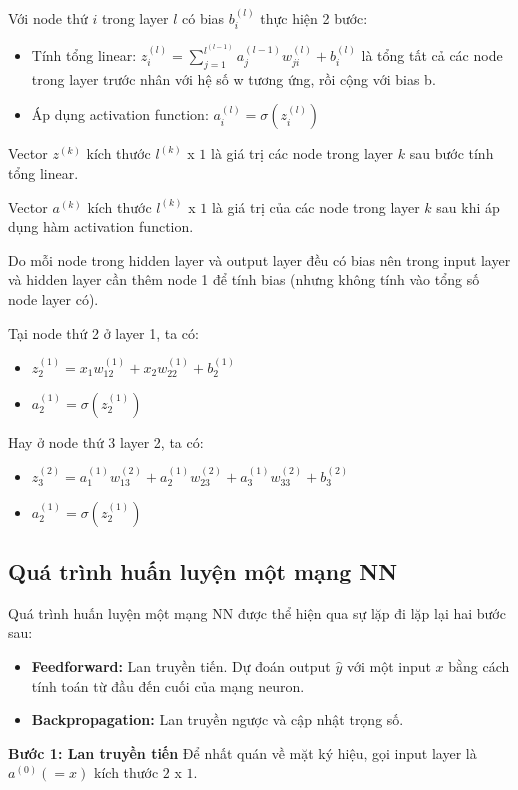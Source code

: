 Với node thứ $i$ trong layer $l$ có bias $b_i^{(l)}$ thực hiện 2 bước:
\begin{itemize}
\item Tính tổng linear: $z_i^{(l)} = \sum_{j=1}^{l^{(l-1)}} a_j^{(l-1)} w_{ji}^{(l)} + b_i^{(l)}$ là tổng tất cả các node trong layer trước nhân với hệ số w tương ứng, rồi cộng với bias b.
\item Áp dụng activation function: $a_i^{(l)} = \sigma(z_i^{(l)})$
\end{itemize}

Vector $z^{(k)}$ kích thước $l^{(k)}$ x $1$ là giá trị các node trong layer $k$ sau bước tính tổng linear.

Vector $a^{(k)}$ kích thước $l^{(k)} $ x $ 1$ là giá trị của các node trong layer $k$ sau khi áp dụng hàm activation function.



Do mỗi node trong hidden layer và output layer đều có bias nên trong input layer và hidden layer cần thêm node 1 để tính bias (nhưng không tính vào tổng số node layer có).

Tại node thứ 2 ở layer 1, ta có:

\begin{itemize}
\item $z_2^{(1)} =  x_1  w_{12}^{(1)} +  x_2  w_{22}^{(1)} + b_2^{(1)}$
\item $a_2^{(1)} = \sigma(z_2^{(1)})$
\end{itemize} 

Hay ở node thứ 3 layer 2, ta có:
\begin{itemize}
\item $z_3^{(2)} =  a_1^{(1)} w_{13}^{(2)} + a_2^{(1)} w_{23}^{(2)}  + a_3^{(1)} w_{33}^{(2)} + b_3^{(2)}$
\item $a_2^{(1)} = \sigma(z_2^{(1)})$
\end{itemize} 

\subsection{Quá trình huấn luyện một mạng NN}

Quá trình huấn luyện một mạng NN được thể hiện qua sự lặp đi lặp lại hai bước sau:
\begin{itemize}
\item \textbf{Feedforward:} Lan truyền tiến. Dự đoán output $\hat{y}$ với một input $x$ bằng cách tính toán từ đầu đến cuối của mạng neuron.
\item \textbf{Backpropagation:} Lan truyền ngược và cập nhật trọng số.
\end{itemize}
\textbf{Bước 1: Lan truyền tiến}
Để nhất quán về mặt ký hiệu, gọi input layer là $a^{(0)} (=x)$ kích thước $2$ x $1$.


